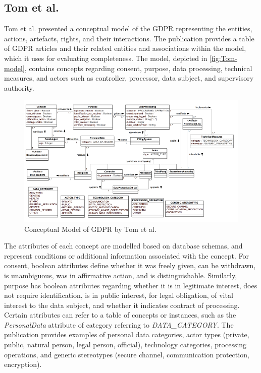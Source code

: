 \subsection{Tom et al.}
Tom et al. \cite{tom_conceptual_2018} presented a conceptual model of the GDPR representing the entities, actions, artefacts, rights, and their interactions. The publication provides a table of GDPR articles and their related entities and associations within the model, which it uses for evaluating completeness.
The model, depicted in \autoref{fig:Tom-model}, contains concepts regarding consent, purpose, data processing, technical measures, and actors such as controller, processor, data subject, and supervisory authority.
\begin{figure}[htbp]
    \centering
    \includegraphics[width=\linewidth]{img/Tom_model.png}
    \caption{Conceptual Model of GDPR by Tom et al. \cite{tom_conceptual_2018}}
    \label{fig:Tom-model}
\end{figure}

The attributes of each concept are modelled based on database schemas, and represent conditions or additional information associated with the concept. For consent, boolean attributes define whether it was freely given, can be withdrawn, is unambiguous, was in affirmative action, and is distinguishable. Similarly, purpose has boolean attributes regarding whether it is in legitimate interest, does not require identification, is in public interest, for legal obligation, of vital interest to the data subject, and whether it indicates contract of processing. Certain attributes can refer to a table of concepts or instances, such as the \textit{PersonalData} attribute of category referring to \textit{DATA\_CATEGORY}. The publication provides examples of personal data categories, actor types (private, public, natural person, legal person, official), technology categories, processing operations, and generic stereotypes (secure channel, communication protection, encryption).

